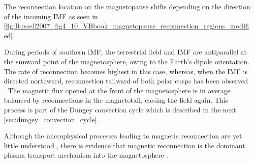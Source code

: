 The reconnection location on the magnetopause shifts depending on the direction of the incoming IMF as seen in \autoref{fig:Russell2007_fig4_10_VBbook_magnetopause_reconnection_regions_modified}.
\begin{figure}[htb]
\end{figure}
During periods of southern IMF, the terrestrial field and IMF are antiparallel at the sunward point of the magnetosphere, owing to the Earth's dipole orientation. The rate of reconnection becomes highest in this case, whereas, when the IMF is directed northward, reconnection tailward of both polar cusps has been observed \citep{Phan2005}. The magnetic flux opened at the front of the magnetosphere is in average balanced by reconnections in the magnetotail, closing the field again. This process is part of the Dungey convection cycle which is described in the next \autoref{sec:dungey_convection_cycle}.

Although the microphysical processes leading to magnetic reconnection are yet little understood \citep{Phan2005}, there is evidence that magnetic reconnection is the dominant plasma transport mechanism into the magnetosphere \citep{DeKeyser2005}.

